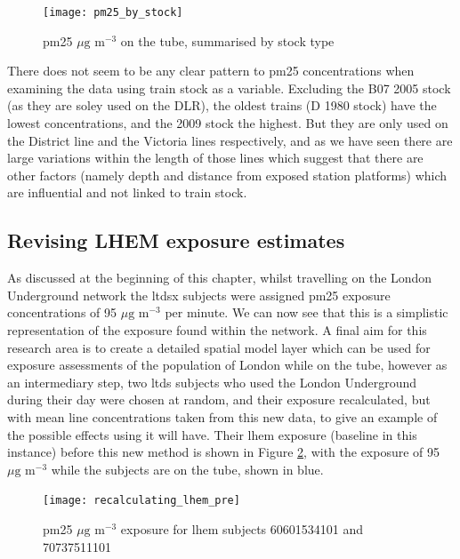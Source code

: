 \begin{figure}[H]
\centering
\texttt{[image: pm25\_by\_stock]}
\caption{\gls{pm25} $\mu \text{g m}^{-3}$ on the tube, summarised by stock type}
\label{fig:pm25_by_stock}
\end{figure}

There does not seem to be any clear pattern to \gls{pm25} concentrations when examining the data using train stock as a variable. Excluding the B07 2005 stock (as they are soley used on the DLR), the oldest trains (D 1980 stock) have the lowest concentrations, and the 2009 stock the highest. But they are only used on the District line and the Victoria lines respectively, and as we have seen there are large variations within the length of those lines which suggest that there are other factors (namely depth and distance from exposed station platforms) which are influential and not linked to train stock.

\subsection{Revising LHEM exposure estimates}
\label{subset:revising_lhem_exposure}
As discussed at the beginning of this chapter, whilst travelling on the London Underground network the \gls{ltdsx} subjects were assigned \gls{pm25} exposure concentrations of 95 $\mu \text{g m}^{-3}$ per minute. We can now see that this is a simplistic representation of the exposure found within the network. A final aim for this research area is to create a detailed spatial model layer which can be used for exposure assessments of the population of London while on the tube, however as an intermediary step, two \gls{ltds} subjects who used the London Underground during their day were chosen at random, and their exposure recalculated, but with mean line concentrations taken from this new data, to give an example of the possible effects using it will have. Their \gls{lhem} exposure (baseline in this instance) before this new method is shown in Figure \ref{fig:lhem_exposure_timeline}, with the exposure of 95 $\mu \text{g m}^{-3}$ while the subjects are on the tube, shown in blue.

\begin{figure}[H]
\centering
\texttt{[image: recalculating\_lhem\_pre]}
\caption{\gls{pm25} $\mu \text{g m}^{-3}$ exposure for \gls{lhem} subjects 60601534101 and 70737511101}
\label{fig:lhem_exposure_timeline}
\end{figure}

